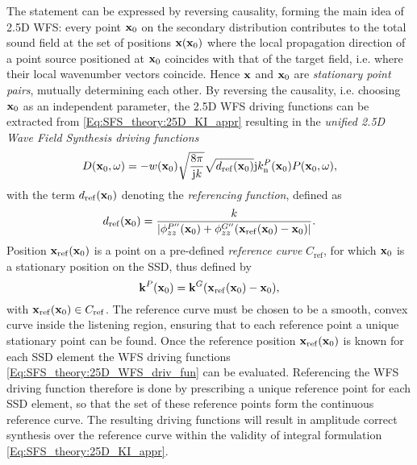 The statement can be expressed by reversing causality, forming the main idea of 2.5D WFS: 
every point $\mathbf{x}_0$ on the secondary distribution contributes to the total sound field at the set of positions $\mathbf{x}(\mathbf{x}_0)$ where the local propagation direction of a point source positioned at $\mathbf{x}_0$ coincides with that of the target field, i.e. where their local wavenumber vectors coincide.
Hence $\mathbf{x}$ and $\mathbf{x}_0$ are \emph{stationary point pairs}, mutually determining each other.
By reversing the causality, i.e. choosing $\mathbf{x}_0$ as an independent parameter, the 2.5D WFS driving functions can be extracted from \eqref{Eq:SFS_theory:25D_KI_appr} resulting in the \emph{unified 2.5D Wave Field Synthesis driving functions}
\begin{equation}
D(\mathbf{x}_0, \omega) = -w(\mathbf{x}_0) 
\sqrt{\frac{8\pi}{\mathrm{j} k}}\sqrt{d_{\mathrm{ref}}(\mathbf{x}_0)}
\mathrm{j} k_{\mathrm{n}}^P(\mathbf{x}_0) 	P(\mathbf{x}_0,\omega),
\label{Eq:SFS_theory:25D_WFS_driv_fun}
\end{equation}
with the term $d_{\mathrm{ref}}(\mathbf{x}_0)$ denoting the \emph{referencing function}, defined as
\begin{equation}
d_{\mathrm{ref}}(\mathbf{x}_0) = \frac{k}{|\phi^{P''}_{zz}(\mathbf{x}_0) +\phi^{G''}_{zz}(\mathbf{x}_{\mathrm{ref}}(\mathbf{x}_0)-\mathbf{x}_0)|}.
\end{equation}
Position $\mathbf{x}_{\mathrm{ref}}(\mathbf{x}_0)$ is a point on a pre-defined \emph{reference curve} $C_{\mathrm{ref}}$, for which $\mathbf{x}_0$ is a stationary position on the SSD, thus defined by
\begin{equation}
\mathbf{k}^P(\mathbf{x}_0) = \mathbf{k}^G(\mathbf{x}_{\mathrm{ref}}(\mathbf{x}_0) - \mathbf{x}_0),
\label{Eq:SFS_theory:WFS_General_Stat_pos}
\end{equation}
with $\mathbf{x}_{\mathrm{ref}}(\mathbf{x}_0) \in C_{\mathrm{ref}}$.
The reference curve must be chosen to be a smooth, convex curve inside the listening region, ensuring that to each reference point a unique stationary point can be found.
Once the reference position $\mathbf{x}_{\mathrm{ref}}(\mathbf{x}_0)$ is known for each SSD element the WFS driving functions \eqref{Eq:SFS_theory:25D_WFS_driv_fun} can be evaluated.
Referencing the WFS driving function therefore is done by prescribing a unique reference point for each SSD element, so that the set of these reference points form the continuous reference curve.
The resulting driving functions will result in amplitude correct synthesis over the reference curve within the validity of integral formulation \eqref{Eq:SFS_theory:25D_KI_appr}.

